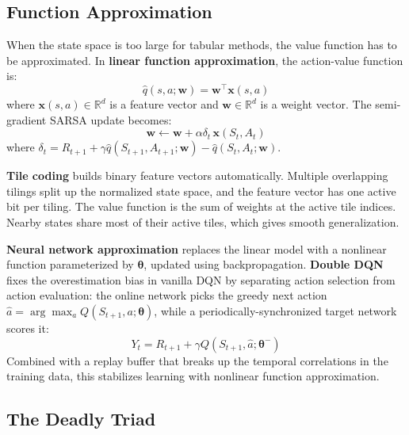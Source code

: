 \documentclass[letterpaper]{article}
\begin{document}
\subsection{Function Approximation}

When the state space is too large for tabular methods, the value function has to be approximated. In \textbf{linear function approximation}, the action-value function is:
\begin{equation}
    \hat{q}(s, a; \mathbf{w}) = \mathbf{w}^\top \mathbf{x}(s, a)
\end{equation}
where $\mathbf{x}(s, a) \in \mathbb{R}^d$ is a feature vector and $\mathbf{w} \in \mathbb{R}^d$ is a weight vector. The semi-gradient SARSA update becomes:
\begin{equation}
    \mathbf{w} \leftarrow \mathbf{w} + \alpha \delta_t \, \mathbf{x}(S_t, A_t)
    \label{eq:linear_update}
\end{equation}
where $\delta_t = R_{t+1} + \gamma \hat{q}(S_{t+1}, A_{t+1}; \mathbf{w}) - \hat{q}(S_t, A_t; \mathbf{w})$.

\textbf{Tile coding} \cite{sutton2018reinforcement,sherstov2005tilecoding} builds binary feature vectors automatically. Multiple overlapping tilings split up the normalized state space, and the feature vector has one active bit per tiling. The value function is the sum of weights at the active tile indices. Nearby states share most of their active tiles, which gives smooth generalization.

\textbf{Neural network approximation} replaces the linear model with a nonlinear function parameterized by $\boldsymbol{\theta}$, updated using backpropagation. \textbf{Double DQN} \cite{vanhasselt2016deep} fixes the overestimation bias in vanilla DQN by separating action selection from action evaluation: the online network picks the greedy next action $\hat{a} = \arg\max_a Q(S_{t+1}, a; \boldsymbol{\theta})$, while a periodically-synchronized target network scores it:
\begin{equation}
    Y_t = R_{t+1} + \gamma Q(S_{t+1}, \hat{a}; \boldsymbol{\theta}^-)
\end{equation}
Combined with a replay buffer that breaks up the temporal correlations in the training data, this stabilizes learning with nonlinear function approximation.

\subsection{The Deadly Triad}
\end{document}
